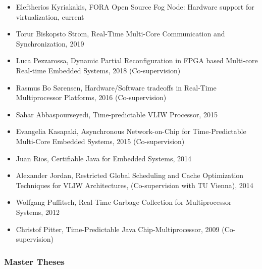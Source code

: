 \documentclass[%
    a4paper,
    11pt, %
    headinclude, footexclude,
    notitlepage,
    headsepline,
    pointlessnumbers,
    ]{scrartcl}
\begin{document}
\begin{itemize}
\item Eleftherios Kyriakakis, FORA Open Source Fog Node: Hardware support for virtualization, current
\item Torur Biskopsto Strom, Real-Time Multi-Core Communication and Synchronization, 2019
  \item Luca Pezzarossa, Dynamic Partial Reconfiguration in FPGA based Multi-core Real-time Embedded Systems, 2018 (Co-supervision)
  \item Rasmus Bo S{\o}rensen, Hardware/Software tradeoffs in Real-Time Multiprocessor Platforms, 2016 (Co-supervision)
  \item Sahar Abbaspourseyedi, Time-predictable VLIW Processor, 2015
  \item Evangelia Kasapaki, Asynchronous Network-on-Chip for Time-Predictable
     Multi-Core Embedded Systems, 2015 (Co-supervision)
  \item Juan Rios, Certifiable Java for Embedded Systems, 2014
  \item Alexander Jordan, Restricted Global Scheduling and Cache Optimization Techniques for VLIW Architectures, (Co-supervision with TU Vienna), 2014
  \item Wolfgang Puffitsch, Real-Time Garbage Collection for
      Multiprocessor Systems, 2012
  \item Christof Pitter, Time-Predictable {Java}
      Chip-Multiprocessor, 2009  (Co-supervision)
\end{itemize}

\subsubsection*{Master Theses}
\end{document}
